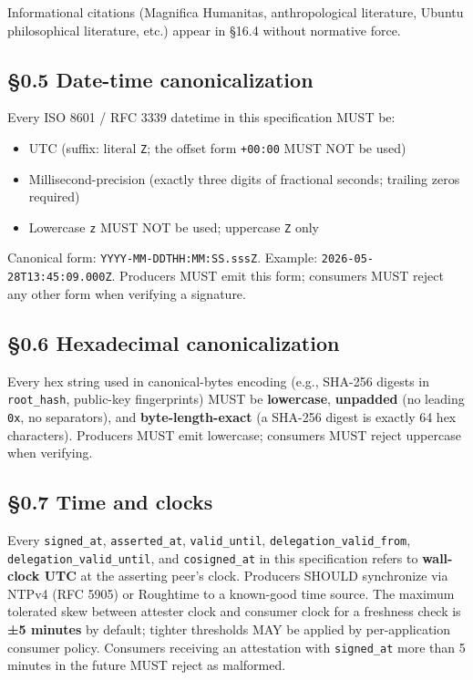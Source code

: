 \documentclass[11pt]{article}
\begin{document}
Informational citations (Magnifica Humanitas, anthropological literature, Ubuntu philosophical literature, etc.) appear in §16.4 without normative force.



\subsection*{§0.5 Date-time canonicalization}


Every ISO 8601 / RFC 3339 datetime in this specification MUST be:


\begin{itemize}\setlength\itemsep{0pt}
\item UTC (suffix: literal \texttt{Z}; the offset form \texttt{+00:00} MUST NOT be used)
\item Millisecond-precision (exactly three digits of fractional seconds; trailing zeros required)
\item Lowercase \texttt{z} MUST NOT be used; uppercase \texttt{Z} only
\end{itemize}


Canonical form: \texttt{YYYY-MM-DDTHH:MM:SS.sssZ}. Example: \texttt{2026-05-28T13:45:09.000Z}. Producers MUST emit this form; consumers MUST reject any other form when verifying a signature.



\subsection*{§0.6 Hexadecimal canonicalization}


Every hex string used in canonical-bytes encoding (e.g., SHA-256 digests in \texttt{root\_hash}, public-key fingerprints) MUST be \textbf{lowercase}, \textbf{unpadded} (no leading \texttt{0x}, no separators), and \textbf{byte-length-exact} (a SHA-256 digest is exactly 64 hex characters). Producers MUST emit lowercase; consumers MUST reject uppercase when verifying.



\subsection*{§0.7 Time and clocks}


Every \texttt{signed\_at}, \texttt{asserted\_at}, \texttt{valid\_until}, \texttt{delegation\_valid\_from}, \texttt{delegation\_valid\_until}, and \texttt{cosigned\_at} in this specification refers to \textbf{wall-clock UTC} at the asserting peer's clock. Producers SHOULD synchronize via NTPv4 (RFC 5905) or Roughtime to a known-good time source. The maximum tolerated skew between attester clock and consumer clock for a freshness check is \textbf{±5 minutes} by default; tighter thresholds MAY be applied by per-application consumer policy. Consumers receiving an attestation with \texttt{signed\_at} more than 5 minutes in the future MUST reject as malformed.
\end{document}

